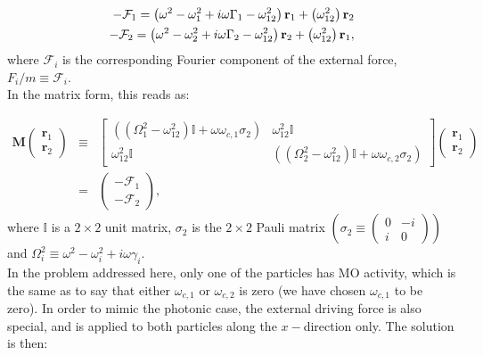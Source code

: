 \begin{eqnarray}
-\mathcal{F}_{1} = \left(\omega^2 - \omega_{1}^{2} + i\omega\Gamma_{1} - \omega_{12}^{2}\right)\bold{r}_{1}+\left(\omega_{12}^2\right)\mathbf{r}_{2}\\
-\mathcal{F}_{2} = \left(\omega^2 - \omega_{2}^{2} + i\omega\Gamma_{2} - \omega_{12}^{2}\right)\bold{r}_{2}+\left(\omega_{12}^2\right)\mathbf{r}_{1},
\end{eqnarray}
where $\mathcal{F}_{i}$ is the corresponding Fourier component of the external force, $F_{i}/m\equiv\mathcal{F}_{i}$.\\
In the matrix form, this reads as:

\begin{eqnarray}
\mathbf{M}\left(\begin{array}{c}
\mathbf{r}_{1}\\
\mathbf{r}_{2}
\end{array}\right) & \equiv & \left[\begin{array}{cc}
\left(\left(\Omega_{1}^{2}-\omega_{12}^{2}\right)\mathbb{\mathbb{I}}+\omega\omega_{c,1}\sigma_{2}\right) & \omega_{12}^{2}\mathbb{I}\\
\omega_{12}^{2}\mathbb{I} & \left(\left(\Omega_{2}^{2}-\omega_{12}^{2}\right)\mathbb{\mathbb{I}}+\omega\omega_{c,2}\sigma_{2}\right)
\end{array}\right]\left(\begin{array}{c}
\mathbf{r}_{1}\\
\mathbf{r}_{2}
\end{array}\right)\nonumber \\
 & = & \left(\begin{array}{c}
-\mathcal{F}_{1}\\
-\mathcal{F}_{2}
\end{array}\right),\label{eq:chap3_mecsystem}
\end{eqnarray}
where $\mathbb{I}$ is a $2\times2$ unit matrix, $\sigma_{2}$ is the $2\times2$ Pauli matrix $\left(\sigma_{2}\equiv \left(\begin{array}{cc}
0 & -i\\
i & 0
\end{array}\right)\right)$ and $\Omega_{i}^2\equiv \omega^2 -\omega_{i}^2 + i\omega \gamma_{i}$.\\
In the problem addressed here, only one of the particles has MO activity, which is the same as to say that either $\omega_{c,1}$ or $\omega_{c,2}$ is zero (we have chosen $\omega_{c,1}$ to be zero). In order to
mimic the photonic case, the external driving force is also special, and is applied to both particles along the $x-$direction only. The solution is then:

